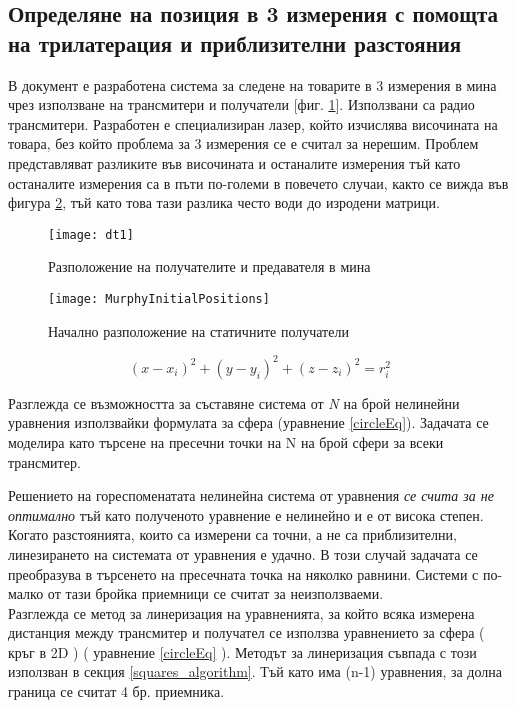 \subsection{Определяне на позиция в 3 измерения с помощта на трилатерация и приблизителни разстояния}

В документ \cite{murphy} е разработена система за следене на товарите в 3 измерения в мина чрез използване на трансмитери и получатели [фиг. \ref{fig:mine}]. Използвани са радио трансмитери. Разработен е специализиран лазер, който изчислява височината на товара, без който проблема за 3 измерения се е считал за нерешим. Проблем представляват разликите във височината и останалите измерения тъй като останалите измерения са в пъти по-големи в повечето случаи, както се вижда във фигура \ref{fig:initPos}, тъй като това тази разлика често води до изродени матрици.

\begin{figure}
    \centering
    \centerline{\texttt{[image: dt1]}}
    \caption{Разположение на получателите и предавателя в мина}
    \label{fig:mine}
\end{figure}

\begin{figure}
    \centering
    \centerline{\texttt{[image: MurphyInitialPositions]}}
    \caption{Начално разположение на статичните получатели}
    \label{fig:initPos}
\end{figure}


\begin{equation}\label{circleEq}
    (x-x_i)^2 + (y-y_i)^2 +(z-z_i)^2=r_i^2
\end{equation}

Разглежда се възможността за съставяне система от \textit{N} на брой нелинейни уравнения използвайки формулата за сфера (уравнение \ref{circleEq}). Задачата се моделира като търсене на пресечни точки на N на брой сфери за всеки трансмитер.

Решението на гореспоменатата нелинейна система от уравнения \emph{се счита за не оптимално} тъй като полученото уравнение е нелинейно и е от висока степен. Когато разстоянията, които са измерени са точни, а не са приблизителни, линезирането на системата от уравнения е удачно. В този случай задачата се преобразува в търсенето на пресечната точка на няколко равнини. Системи с по-малко от тази бройка приемници се считат за неизползваеми. \\

Разглежда се метод за линеризация на уравненията, за който всяка измерена дистанция между трансмитер и получател се използва уравнението за сфера ( кръг в 2D ) ( уравнение \ref{circleEq} ). Методът за линеризация съвпада с този използван в секция \ref{squares_algorithm}. Тъй като има (n-1) уравнения, за долна граница се считат 4 бр. приемника.
\\

